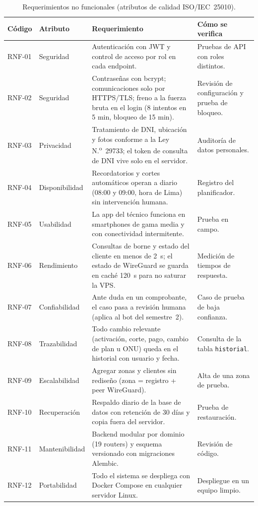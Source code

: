 \begin{table}[H]
\centering
\caption{Requerimientos no funcionales (atributos de calidad ISO/IEC~25010).}
\label{tab:ce02-rnf}
\small
\begin{tabularx}{\textwidth}{L{1.4cm}L{2.3cm}XL{3.3cm}}
\toprule
\textbf{Código} & \textbf{Atributo} & \textbf{Requerimiento} & \textbf{Cómo se verifica} \\
\midrule
RNF-01 & Seguridad & Autenticación con JWT y control de acceso por rol en cada endpoint. & Pruebas de API con roles distintos. \\
RNF-02 & Seguridad & Contraseñas con bcrypt; comunicaciones solo por HTTPS/TLS; freno a la fuerza bruta en el login (8 intentos en 5 min, bloqueo de 15 min). & Revisión de configuración y prueba de bloqueo. \\
RNF-03 & Privacidad & Tratamiento de DNI, ubicación y fotos conforme a la Ley N.\textsuperscript{o}~29733; el token de consulta de DNI vive solo en el servidor. & Auditoría de datos personales. \\
RNF-04 & Disponibilidad & Recordatorios y cortes automáticos operan a diario (08:00 y 09:00, hora de Lima) sin intervención humana. & Registro del planificador. \\
RNF-05 & Usabilidad & La app del técnico funciona en smartphones de gama media y con conectividad intermitente. & Prueba en campo. \\
RNF-06 & Rendimiento & Consultas de borne y estado del cliente en menos de 2~s; el estado de WireGuard se guarda en caché 120~s para no saturar la VPS. & Medición de tiempos de respuesta. \\
RNF-07 & Confiabilidad & Ante duda en un comprobante, el caso pasa a revisión humana (aplica al bot del semestre~2). & Caso de prueba de baja confianza. \\
RNF-08 & Trazabilidad & Todo cambio relevante (activación, corte, pago, cambio de plan u ONU) queda en el historial con usuario y fecha. & Consulta de la tabla \texttt{historial}. \\
RNF-09 & Escalabilidad & Agregar zonas y clientes sin rediseño (zona = registro + peer WireGuard). & Alta de una zona de prueba. \\
RNF-10 & Recuperación & Respaldo diario de la base de datos con retención de 30 días y copia fuera del servidor. & Prueba de restauración. \\
RNF-11 & Mantenibilidad & Backend modular por dominio (19 routers) y esquema versionado con migraciones Alembic. & Revisión de código. \\
RNF-12 & Portabilidad & Todo el sistema se despliega con Docker Compose en cualquier servidor Linux. & Despliegue en un equipo limpio. \\
\bottomrule
\end{tabularx}
\end{table}

